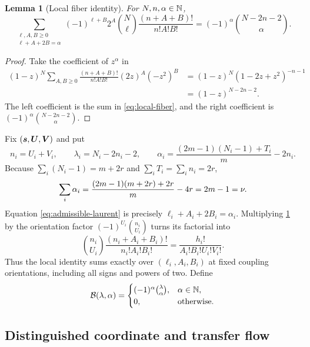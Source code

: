 \documentclass[11pt]{article}
\newtheorem{lemma}[theorem]{Lemma}
\theoremstyle{definition}
\theoremstyle{remark}
\begin{document}
\begin{lemma}[Local fiber identity]
\label{lem:local-fiber}
For \(N,n,\alpha\in\mathbb{N}\),
\begin{equation}
\sum_{\substack{\ell,A,B\ge0\\\ell+A+2B=\alpha}}
(-1)^{\ell+B}2^A\binom{N}{\ell}
\frac{(n+A+B)!}{n!A!B!}
=(-1)^\alpha\binom{N-2n-2}{\alpha}.
\label{eq:local-fiber}
\end{equation}
\end{lemma}

\begin{proof}
Take the coefficient of \(z^\alpha\) in
\begin{align*}
(1-z)^N
\sum_{A,B\ge0}
\frac{(n+A+B)!}{n!A!B!}(2z)^A(-z^2)^B
&=(1-z)^N(1-2z+z^2)^{-n-1}\\
&=(1-z)^{N-2n-2}.
\end{align*}
The left coefficient is the sum in \eqref{eq:local-fiber}, and the right
coefficient is \((-1)^\alpha\binom{N-2n-2}{\alpha}\).
\end{proof}

Fix \((\boldsymbol{s},\boldsymbol{U},\boldsymbol{V})\) and put
\begin{equation}
n_i=U_i+V_i,
\qquad
\lambda_i=N_i-2n_i-2,
\qquad
\alpha_i=\frac{(2m-1)(N_i-1)+T_i}{m}-2n_i.
\label{eq:local-exponents}
\end{equation}
Because \(\sum_i(N_i-1)=m+2r\) and
\(\sum_iT_i=\sum_i n_i=2r\),
\begin{equation}
\sum_i\alpha_i
=\frac{(2m-1)(m+2r)+2r}{m}-4r
=2m-1=\nu.
\label{eq:alpha-sum}
\end{equation}
Equation \eqref{eq:admissible-laurent} is precisely
\(\ell_i+A_i+2B_i=\alpha_i\).  Multiplying
\cref{lem:local-fiber} by the orientation factor
\((-1)^{U_i}\binom{n_i}{U_i}\) turns its factorial into
\[
\binom{n_i}{U_i}
\frac{(n_i+A_i+B_i)!}{n_i!A_i!B_i!}
=\frac{h_i!}{A_i!B_i!U_i!V_i!}.
\]
Thus the local identity sums exactly over
\((\ell_i,A_i,B_i)\) at fixed coupling orientations, including all signs and
powers of two.  Define
\begin{equation}
\mathcal{B}(\lambda,\alpha)=
\begin{cases}
(-1)^\alpha\binom{\lambda}{\alpha},&\alpha\in\mathbb{N},\\
0,&\text{otherwise}.
\end{cases}
\label{eq:B-local}
\end{equation}

\subsection{Distinguished coordinate and transfer flow}
\label{subsec:transfer}
\end{document}

